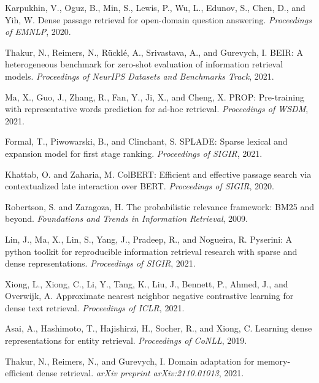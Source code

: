 \documentclass{neurips_2025}
\begin{document}
\begin{thebibliography}{99}

Karpukhin, V., Oguz, B., Min, S., Lewis, P., Wu, L., Edunov, S., Chen, D., and Yih, W.
Dense passage retrieval for open-domain question answering.
\textit{Proceedings of EMNLP}, 2020.

Thakur, N., Reimers, N., Rücklé, A., Srivastava, A., and Gurevych, I.
BEIR: A heterogeneous benchmark for zero-shot evaluation of information retrieval models.
\textit{Proceedings of NeurIPS Datasets and Benchmarks Track}, 2021.

Ma, X., Guo, J., Zhang, R., Fan, Y., Ji, X., and Cheng, X.
PROP: Pre-training with representative words prediction for ad-hoc retrieval.
\textit{Proceedings of WSDM}, 2021.

Formal, T., Piwowarski, B., and Clinchant, S.
SPLADE: Sparse lexical and expansion model for first stage ranking.
\textit{Proceedings of SIGIR}, 2021.

Khattab, O. and Zaharia, M.
ColBERT: Efficient and effective passage search via contextualized late interaction over BERT.
\textit{Proceedings of SIGIR}, 2020.

Robertson, S. and Zaragoza, H.
The probabilistic relevance framework: BM25 and beyond.
\textit{Foundations and Trends in Information Retrieval}, 2009.

Lin, J., Ma, X., Lin, S., Yang, J., Pradeep, R., and Nogueira, R.
Pyserini: A python toolkit for reproducible information retrieval research with sparse and dense representations.
\textit{Proceedings of SIGIR}, 2021.

Xiong, L., Xiong, C., Li, Y., Tang, K., Liu, J., Bennett, P., Ahmed, J., and Overwijk, A.
Approximate nearest neighbor negative contrastive learning for dense text retrieval.
\textit{Proceedings of ICLR}, 2021.

Asai, A., Hashimoto, T., Hajishirzi, H., Socher, R., and Xiong, C.
Learning dense representations for entity retrieval.
\textit{Proceedings of CoNLL}, 2019.

Thakur, N., Reimers, N., and Gurevych, I.
Domain adaptation for memory-efficient dense retrieval.
\textit{arXiv preprint arXiv:2110.01013}, 2021.


\end{thebibliography}
\end{document}
